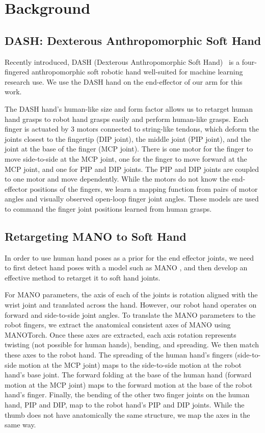 \section{Background}
\label{sec:background}

\subsection{DASH: Dexterous Anthropomorphic Soft Hand}

Recently introduced, DASH (Dexterous Anthropomorphic Soft Hand)~\citep{mannam2023framework} is a four-fingered anthropomorphic soft robotic hand well-suited for machine learning research use.  We use the DASH hand on the end-effector of our arm for this work. 

The DASH hand's human-like size and form factor allows us to retarget human hand grasps to robot hand grasps easily and perform human-like grasps.  Each finger is actuated by 3 motors connected to string-like tendons, which deform the joints closest to the fingertip (DIP joint), the middle joint (PIP joint), and the joint at the base of the finger (MCP joint).  There is one motor for the finger to move side-to-side at the MCP joint, one for the finger to move forward at the MCP joint, and one for PIP and DIP joints.  The PIP and DIP joints are coupled to one motor and move dependently.  While the motors do not know the end-effector positions of the fingers, we learn a mapping function from pairs of motor angles and visually observed open-loop finger joint angles. These models are used to command the finger joint positions learned from human grasps.  

\subsection{Retargeting MANO to Soft Hand}

In order to use human hand poses as a prior for the end effector joints, we need to first detect hand poses with a model such as MANO \cite{MANO:SIGGRAPHASIA:2017}, and then develop an effective method to retarget it to soft hand joints.

For MANO parameters, the axis of each of the joints is rotation aligned with the wrist joint and translated across the hand.  However, our robot hand operates on forward and side-to-side joint angles.  To translate the MANO parameters to the robot fingers, we extract the anatomical consistent axes of MANO using MANOTorch. Once these axes are extracted, each axis rotation represents twisting (not possible for human hands), bending, and spreading.  We then match these axes to the robot hand.  The spreading of the human hand's fingers (side-to-side motion at the MCP joint) maps to the side-to-side motion at the robot hand's base joint.  The forward folding at the base of the human hand (forward motion at the MCP joint) maps to the forward motion at the base of the robot hand's finger.  Finally, the bending of the other two finger joints on the human hand, PIP and DIP, map to the robot hand's PIP and DIP joints.  While the thumb does not have anatomically the same structure, we map the axes in the same way. 

